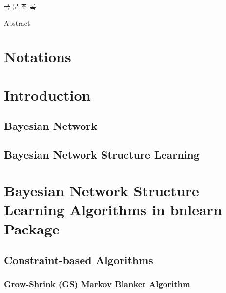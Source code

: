 \documentclass[12pt,a4paper,oneside]{book}
\theoremstyle{plain}
\theoremstyle{definition}
\theoremstyle{remark}
\theoremstyle{definition}
\numberwithin{equation}{chapter}
\begin{document}
\newpage{}

\begin{center}
{\Large 국 문 초 록}
\end{center}




\newpage{}
\begin{center}
{\Large Abstract}
\end{center}

 \tableofcontents
 \newpage
 \listoftables
 \newpage
 \listoffigures

\newpage

 \setcounter{page}{1}

\chapter*{Notations}





\chapter{Introduction}

\section{Bayesian Network}


\section{Bayesian Network Structure Learning}






\chapter{Bayesian Network Structure Learning Algorithms in bnlearn Package}


%
\section{Constraint-based Algorithms}
\subsection{Grow-Shrink (GS) Markov Blanket Algorithm}

\end{document}
